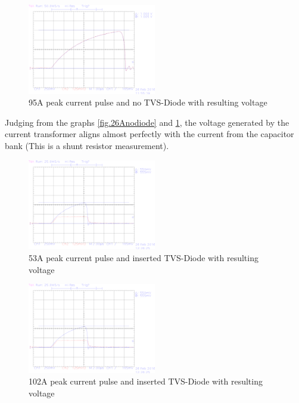 \begin{figure}[!ht]
	\centering
	\includegraphics[width=0.5\textwidth]{figures/Voltage_Clamping/TEK00004.eps}		
	\caption[Kurze Abbildungsbeschreibung]{95A peak current pulse and no TVS-Diode with resulting voltage} 
	\label{fig.100Anodiode}
\end{figure}

Judging from the graphs \ref{fig.26Anodiode} and \ref{fig.100Anodiode}, the voltage generated by the current transformer aligns almost
perfectly with the current from the capacitor bank (This is a shunt resistor measurement).

\begin{figure}[!ht]
	\centering
	\includegraphics[width=0.5\textwidth]{figures/Voltage_Clamping/TEK00006.eps}		
	\caption[Kurze Abbildungsbeschreibung]{53A peak current pulse and inserted TVS-Diode with resulting voltage} 
	\label{fig.53Adiode}
\end{figure}

\begin{figure}[!ht]
	\centering
	\includegraphics[width=0.5\textwidth]{figures/Voltage_Clamping/TEK00006.eps}		
	\caption[Kurze Abbildungsbeschreibung]{102A peak current pulse and inserted TVS-Diode with resulting voltage} 
	\label{fig.100Adiode}
\end{figure}

